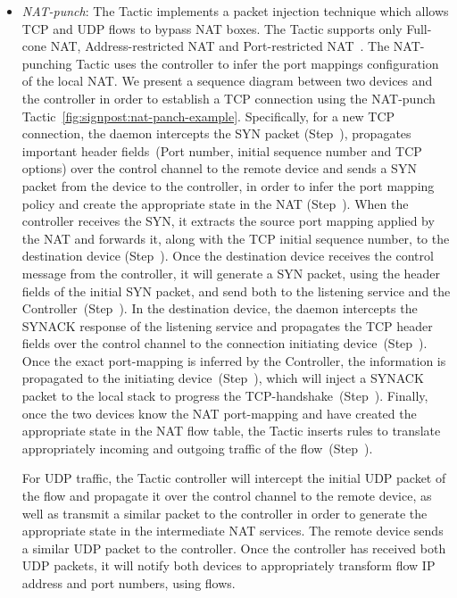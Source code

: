 \begin{itemize}
  \item \emph{NAT-punch}: The Tactic implements a packet injection technique which
    allows TCP and UDP flows to bypass NAT boxes. The Tactic supports only
    Full-cone NAT, Address-restricted NAT and Port-restricted
    NAT~.  The NAT-punching Tactic uses the \signpost controller to infer
    the port mappings configuration of the local NAT\@. We present a sequence
    diagram between two devices and the \signpost controller in order to establish a TCP
    connection using the NAT-punch Tactic~\ref{fig:signpost:nat-panch-example}.
    Specifically, for a new TCP connection, the daemon intercepts the SYN packet
    (Step~), propagates important header fields~(Port number, initial
    sequence number and TCP options) over the control channel to the remote
    device and sends a SYN packet from the device to the \signpost controller, in
    order to infer the port mapping policy and create the appropriate state in the
    NAT (Step~). When the \signpost controller receives the SYN, it
    extracts the source port mapping applied by the NAT and forwards it, along
    with the TCP initial sequence number, to the destination device
    (Step~).  Once the destination device receives the control message
    from the \signpost controller, it will generate a SYN packet, using the header fields
    of the initial SYN packet, and send both to the listening service and the
    \signpost Controller~(Step~). In the destination device, the
    \signpost daemon intercepts the SYNACK response of the listening service and
    propagates the TCP header fields over the control channel to the connection
    initiating device~(Step~).  Once the exact port-mapping is
    inferred by the Controller, the information is propagated to the initiating
    device~(Step~), which will inject a SYNACK packet to the local
    stack to progress the TCP-handshake~(Step~). Finally, once the two
    devices know the NAT port-mapping and have created the appropriate state in the
    NAT flow table, the Tactic inserts \of rules to translate appropriately
    incoming and outgoing traffic of the flow~(Step~).

    For UDP traffic, the Tactic controller will intercept the initial UDP packet
    of the flow and propagate it over the control channel to the remote device,
    as well as transmit a similar packet to the \signpost controller in order
    to generate the appropriate state in the intermediate NAT services. The remote
    device sends a similar UDP packet to the \signpost controller. Once the
    controller has received both UDP packets, it will notify both devices to
    appropriately transform flow IP address and port numbers, using \of flows. 
\end{itemize}

